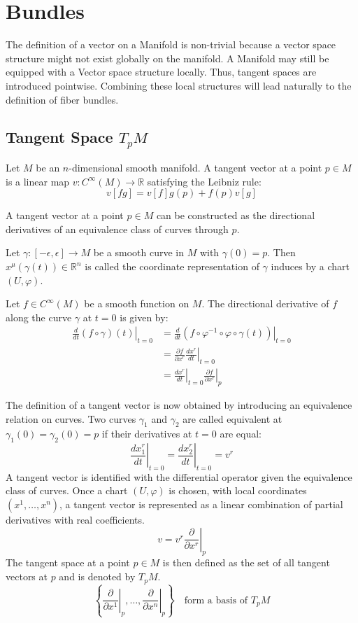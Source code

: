 
\chapter{Bundles}

  The definition of a vector on a Manifold is non-trivial because a vector space structure might not exist globally on the manifold. A Manifold may still be equipped with a Vector space structure locally. Thus, tangent spaces are introduced pointwise. Combining these local structures will lead naturally to the definition of fiber bundles.

\section{Tangent Space $T_pM$}

  Let $M$ be an $n$-dimensional smooth manifold. A tangent vector at a point $p \in M$ is a linear map $v: C^\infty(M) \to \mathbb{R}$ satisfying the Leibniz rule\cite{FredericSchullerDifferentialstructurespivotalconcepttangentvectorspacesLec09FredericSchuller2015}:
 \[ v[fg] = v[f]g(p) + f(p)v[g] \]

  A tangent vector at a point $p \in M$ can be constructed as the directional derivatives of an equivalence class of curves through $p$\cite{NakaharaGeometrytopologyphysics2005}.

  Let $\gamma: [-\epsilon, \epsilon] \to M$ be a smooth curve in $M$ with $\gamma(0)=p$. Then $x^\mu(\gamma(t)) \in \mathbb{R}^n$ is called the coordinate representation of $\gamma$ induces by a chart $(U, \varphi)$.

Let $f \in C^\infty(M)$ be a smooth function on $M$. The directional derivative of $f$ along the curve $\gamma$ at $t=0$ is given by:
\begin{align*}
\left. \frac{d}{dt} (f \circ \gamma)(t) \right|_{t=0}
  &= \left. \frac{d}{dt} \left( f\circ \varphi^{-1}\circ\varphi\circ\gamma(t) \right) \right|_{t=0} \\
&= \left. \frac{\partial f}{\partial x^r} \frac{d x^r}{dt} \right|_{t=0} \\
&= \left. \frac{d x^r}{dt} \right|_{t=0} \left. \frac{\partial f}{\partial x^r} \right|_p
\end{align*}

The definition of a tangent vector is now obtained by introducing an equivalence relation on curves. Two curves $\gamma_1$ and $\gamma_2$ are called equivalent at $\gamma_1(0)=\gamma_2(0)=p$ if their derivatives at $t=0$ are equal:
\[
\left. \frac{d x_1^r}{dt} \right|_{t=0}
= \left. \frac{d x_2^r}{dt} \right|_{t=0}
= v^r
\]
A tangent vector is identified with the differential operator given the equivalence class of curves. Once a chart $(U, \varphi)$ is chosen, with local coordinates $(x^1, \dots, x^n)$, a tangent vector is represented as a linear combination of partial derivatives with real coefficients.
\[
v = v^r \left. \frac{\partial}{\partial x^r} \right|_p
\]
The tangent space at a point $p \in M$ is then defined as the set of all tangent vectors at $p$ and is denoted by $T_pM$.
\[
\left\{ \left. \frac{\partial}{\partial x^1} \right|_p, \dots, \left. \frac{\partial}{\partial x^n} \right|_p \right\} \quad \text{form a basis of } T_pM
\]



